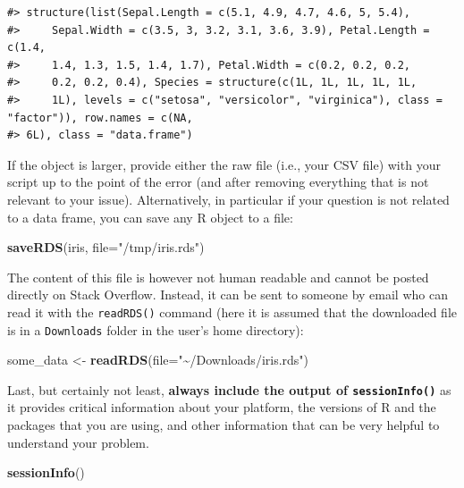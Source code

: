 \documentclass[
]{book}
\newenvironment{Shaded}{\begin{snugshade}}{\end{snugshade}}
\newcommand{\AttributeTok}[1]{\textcolor[rgb]{0.13,0.29,0.53}{#1}}
\newcommand{\FunctionTok}[1]{\textcolor[rgb]{0.13,0.29,0.53}{\textbf{#1}}}
\newcommand{\NormalTok}[1]{#1}
\newcommand{\OtherTok}[1]{\textcolor[rgb]{0.56,0.35,0.01}{#1}}
\newcommand{\StringTok}[1]{\textcolor[rgb]{0.31,0.60,0.02}{#1}}
\begin{document}
\begin{verbatim}
#> structure(list(Sepal.Length = c(5.1, 4.9, 4.7, 4.6, 5, 5.4), 
#>     Sepal.Width = c(3.5, 3, 3.2, 3.1, 3.6, 3.9), Petal.Length = c(1.4, 
#>     1.4, 1.3, 1.5, 1.4, 1.7), Petal.Width = c(0.2, 0.2, 0.2, 
#>     0.2, 0.2, 0.4), Species = structure(c(1L, 1L, 1L, 1L, 1L, 
#>     1L), levels = c("setosa", "versicolor", "virginica"), class = "factor")), row.names = c(NA, 
#> 6L), class = "data.frame")
\end{verbatim}

If the object is larger, provide either the raw file (i.e., your CSV file) with
your script up to the point of the error (and after removing everything that is
not relevant to your issue). Alternatively, in particular if your question is
not related to a data frame, you can save any R object to a file:

\begin{Shaded}
\begin{Highlighting}[]
\FunctionTok{saveRDS}\NormalTok{(iris, }\AttributeTok{file=}\StringTok{"/tmp/iris.rds"}\NormalTok{)}
\end{Highlighting}
\end{Shaded}

The content of this file is however not human readable and cannot be posted
directly on Stack Overflow. Instead, it can be sent to someone by email who can
read it with the \texttt{readRDS()} command (here it is assumed that the downloaded
file is in a \texttt{Downloads} folder in the user's home directory):

\begin{Shaded}
\begin{Highlighting}[]
\NormalTok{some\_data }\OtherTok{\textless{}{-}} \FunctionTok{readRDS}\NormalTok{(}\AttributeTok{file=}\StringTok{"\textasciitilde{}/Downloads/iris.rds"}\NormalTok{)}
\end{Highlighting}
\end{Shaded}

Last, but certainly not least, \textbf{always include the output of \texttt{sessionInfo()}}
as it provides critical information about your platform, the versions of R and
the packages that you are using, and other information that can be very helpful
to understand your problem.

\begin{Shaded}
\begin{Highlighting}[]
\FunctionTok{sessionInfo}\NormalTok{()}
\end{Highlighting}
\end{Shaded}
\end{document}
